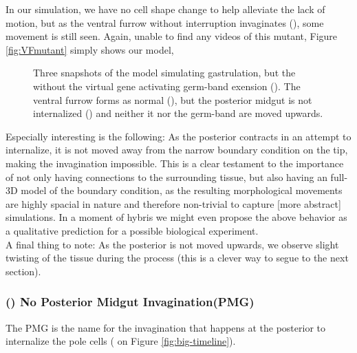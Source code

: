 In our simulation, we have no cell shape change to help alleviate the lack of motion, but as the ventral furrow without interruption invaginates (), some movement is still seen. 
Again, unable to find any videos of this mutant, Figure \ref{fig:VFmutant} simply shows our model,

\begin{figure}[H]
    \centering

    \caption{Three snapshots of the model simulating gastrulation, but the without the virtual gene activating germ-band exension (). The ventral furrow forms as normal (), but the posterior midgut is not internalized () and neither it nor the germ-band are moved upwards.}
    \label{fig:germ-band-mutant}
\end{figure}

Especially interesting is the following: As the posterior contracts in an attempt to internalize, it is not moved away from the narrow boundary condition on the tip, making the invagination impossible. This is a clear testament to the importance of not only having  connections to the surrounding tissue, but also having an full-3D model of the boundary condition, as the resulting morphological movements are highly spacial in nature and therefore non-trivial to capture [more abstract] simulations. In a moment of hybris we might even propose the above behavior as a qualitative prediction for a possible biological experiment.\\  
A final thing to note: As the posterior is not moved upwards, we observe slight twisting of the tissue during the process (this is a clever way to segue to the next section). 


\subsubsection{() No Posterior Midgut Invagination(PMG)}
The PMG is the name for the invagination that happens at the posterior to internalize the pole cells ( on Figure \ref{fig:big-timeline}).


